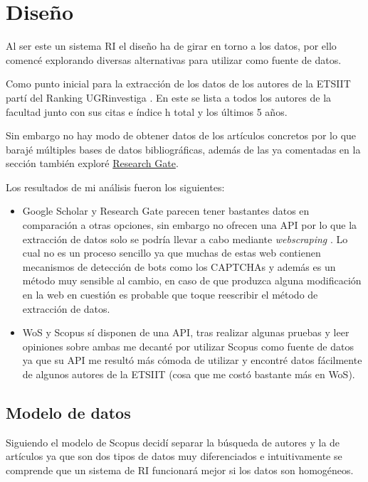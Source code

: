 \chapter{Diseño}

Al ser este un sistema \acrshort{RI} el diseño ha de girar en torno a los datos, por ello comencé explorando diversas alternativas para utilizar como fuente de datos. 

Como punto inicial para la extracción de los datos de los autores de la \acrshort{ETSIIT} partí del Ranking UGRinvestiga \cite{Ranking_UGRInvestiga}. En este se lista a todos los autores de la facultad junto con sus citas e índice h total y los últimos 5 años.

Sin embargo no hay modo de obtener datos de los artículos concretos por lo que barajé múltiples bases de datos bibliográficas, además de las ya comentadas en la sección  también exploré \href{https://www.researchgate.net/}{Research Gate}.

Los resultados de mi análisis fueron los siguientes: 
\label{ls:dataSourceAnalisis}
\begin{itemize}
	
	\item Google Scholar y Research Gate parecen tener bastantes datos en comparación a otras opciones, sin embargo no ofrecen una \acrshort{API} por lo que la extracción de datos solo se podría llevar a cabo mediante \textit{\gls{webscraping}} . Lo cual no es un proceso sencillo ya que muchas de estas web contienen mecanismos de detección de bots como los CAPTCHAs \cite{scrapping_GS} y además es un método muy sensible al cambio, en caso de que produzca alguna modificación en la web en cuestión es probable que toque reescribir el método de extracción de datos.
	\item \acrshort{WoS} y Scopus sí disponen de una \acrshort{API}, tras realizar algunas pruebas y leer opiniones sobre ambas me decanté por utilizar Scopus como fuente de datos ya que su \acrshort{API} me resultó más cómoda de utilizar y encontré datos fácilmente de algunos autores de la \acrshort{ETSIIT} (cosa que me costó bastante más en \acrshort{WoS}).
\end{itemize}

\section{Modelo de datos}

Siguiendo el modelo de Scopus decidí separar la búsqueda de autores y la de artículos ya que son dos tipos de datos muy diferenciados e intuitivamente se comprende que un sistema de \acrshort{RI} funcionará mejor si los datos son homogéneos.

